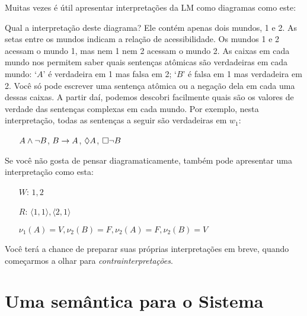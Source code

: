  Muitas vezes é útil apresentar interpretações da LM como diagramas como este:
\begin{center}
\end{center}
Qual a interpretação deste diagrama? Ele contém apenas dois mundos,  1 e 2. As setas entre os mundos indicam a relação de acessibilidade. Os mundos 1 e  2 acessam o mundo 1, mas nem 1 nem 2 acessam o mundo 2. As caixas em cada mundo nos permitem saber quais sentenças atômicas são verdadeiras em cada mundo: `$A$' é verdadeira em  1 mas  falsa em 2; `$B$' é  falsa em 1 mas verdadeira em 2. Você só pode escrever uma sentença atômica ou a negação dela  em cada uma dessas caixas. A partir daí, podemos descobri facilmente  quais são   os valores de verdade das sentenças complexas em cada mundo. Por exemplo,  nesta interpretação, todas as sentenças a seguir são verdadeiras em  $w_1$: 
 
\begin{itemize}
	\item[]$A\wedge\neg B$, $B\rightarrow A$, $\Diamond A$, $\Box\neg B$
\end{itemize}
Se você não gosta de pensar diagramaticamente, também pode apresentar uma interpretação como esta:
\begin{itemize}
	\item[$W$:]$1,2$
	\item[$R$:]$\langle 1,1\rangle, \langle 2,1\rangle$
	\item[]$\nu_{1}(A)=V, \nu_{2}(B)=F, \nu_{2}(A)=F, \nu_{2}(B)=V$
\end{itemize}
Você terá a chance de preparar suas próprias interpretações 
em breve, quando começarmos a olhar para \emph{contrainterpretações}. %

\section{Uma semântica para o Sistema \mlK}
\label{SemanticsK}

